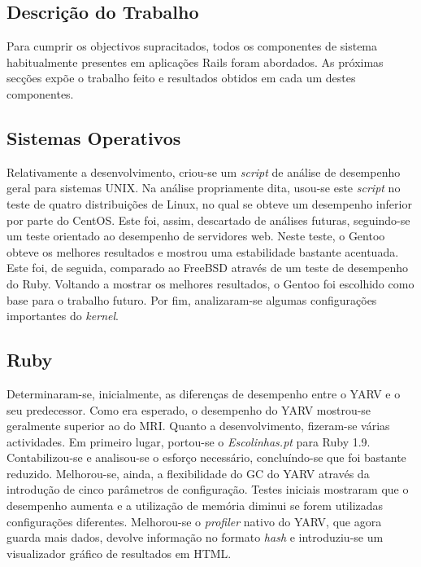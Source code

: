 \documentclass[9pt,a4paper]{extarticle}
\begin{document}
\begin{multicols}{2}
\section{Descrição do Trabalho}
Para cumprir os objectivos supracitados, todos os componentes de sistema habitualmente presentes em aplicações Rails foram abordados. As próximas secções expõe o trabalho feito e resultados obtidos em cada um destes componentes.


\subsection{Sistemas Operativos}
Relativamente a desenvolvimento, criou-se um \textit{script} de análise de desempenho geral para sistemas UNIX. Na análise propriamente dita, usou-se este \textit{script} no teste de quatro distribuições de Linux, no qual se obteve um desempenho inferior por parte do CentOS. Este foi, assim, descartado de análises futuras, seguindo-se um teste orientado ao desempenho de servidores web. Neste teste, o Gentoo obteve os melhores resultados e mostrou uma estabilidade bastante acentuada. Este foi, de seguida, comparado ao FreeBSD através de um teste de desempenho do Ruby. Voltando a mostrar os melhores resultados, o Gentoo foi escolhido como base para o trabalho futuro. Por fim, analizaram-se algumas configurações importantes do \textit{kernel}.


\subsection{Ruby}
Determinaram-se, inicialmente, as diferenças de desempenho entre o YARV e o seu predecessor. Como era esperado, o desempenho do YARV mostrou-se geralmente superior ao do MRI. Quanto a desenvolvimento, fizeram-se várias actividades. Em primeiro lugar, portou-se o \textit{Escolinhas.pt} para Ruby 1.9. Contabilizou-se e analisou-se o esforço necessário, concluíndo-se que foi bastante reduzido. Melhorou-se, ainda, a flexibilidade do GC do YARV através da introdução de cinco parâmetros de configuração. Testes iniciais mostraram que o desempenho aumenta e a utilização de memória diminui se forem utilizadas configurações diferentes. Melhorou-se o \textit{profiler} nativo do YARV, que agora guarda mais dados, devolve informação no formato \textit{hash} e introduziu-se um visualizador gráfico de resultados em HTML.



\end{multicols}
\end{document}
